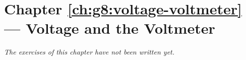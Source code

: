 \section*{Chapter \ref{ch:g8:voltage-voltmeter} --- Voltage and the Voltmeter}


\emph{The exercises of this chapter have not been written yet.}
